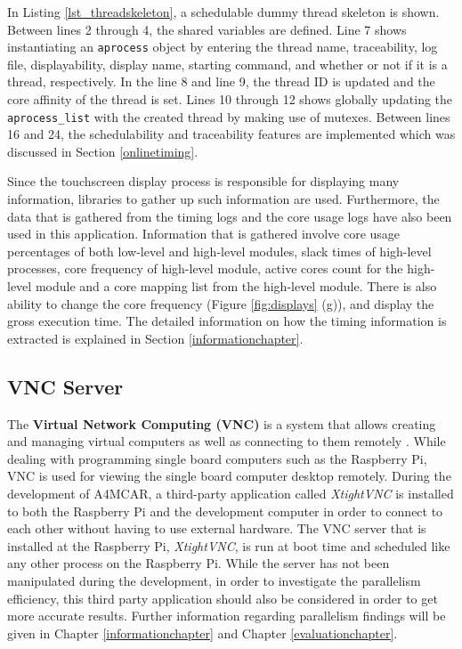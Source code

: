 In Listing \ref{lst_threadskeleton}, a schedulable dummy thread skeleton is shown. Between lines 2 through 4, the shared variables are defined. Line 7 shows instantiating an \texttt{aprocess} object by entering the thread name, traceability, log file, displayability, display name, starting command, and whether or not if it is a thread, respectively. In the line 8 and line 9, the thread ID is updated and the core affinity of the thread is set. Lines 10 through 12 shows globally updating the \texttt{aprocess{\_}list} with the created thread by making use of mutexes. Between lines 16 and 24, the schedulability and traceability features are implemented which was discussed in Section \ref{onlinetiming}.

Since the touchscreen display process is responsible for displaying many information, libraries to gather up such information are used. Furthermore, the data that is gathered from the timing logs and the core usage logs have also been used in this application. Information that is gathered involve core usage percentages of both low-level and high-level modules, slack times of high-level processes, core frequency of high-level module, active cores count for the high-level module and a core mapping list from the high-level module. There is also ability to change the core frequency (Figure \ref{fig:displays} (g)), and display the gross execution time. The detailed information on how the timing information is extracted is explained in Section \ref{informationchapter}.

\subsection{VNC Server}
The \textbf{Virtual Network Computing (VNC)} is a system that allows creating and managing virtual computers as well as connecting to them remotely \cite{vncmagazine}. While dealing with programming single board computers such as the Raspberry Pi, VNC is used for viewing the single board computer desktop remotely. During the development of A4MCAR, a third-party application called \textit{XtightVNC} is installed to both the Raspberry Pi and the development computer in order to connect to each other without having to use external hardware.  The VNC server that is installed at the Raspberry Pi, \textit{XtightVNC}, is run at boot time and scheduled like any other process on the Raspberry Pi. While the server has not been manipulated during the development, in order to investigate the parallelism efficiency, this third party application should also be considered in order to get more accurate results. Further information regarding parallelism findings will be given in Chapter \ref{informationchapter} and Chapter \ref{evaluationchapter}. 


